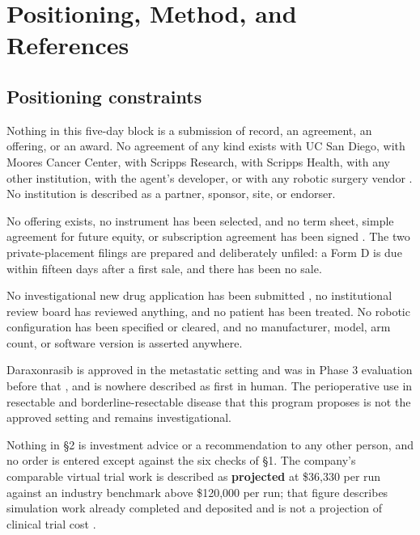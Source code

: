 \section{Positioning, Method, and References}

\subsection{Positioning constraints}

Nothing in this five-day block is a submission of record, an agreement, an
offering, or an award. No agreement of any kind exists with UC San Diego, with
Moores Cancer Center, with Scripps Research, with Scripps Health, with any other
institution, with the agent's developer, or with any robotic surgery vendor
\cite{ucsdmoores2026,scrippsdtc2026,revmedexternal2026}. No institution is
described as a partner, sponsor, site, or endorser.

No offering exists, no instrument has been selected, and no term sheet, simple
agreement for future equity, or subscription agreement has been signed
\cite{secformd2026}. The two private-placement filings are prepared and
deliberately unfiled: a Form D is due within fifteen days after a first sale, and
there has been no sale.

No investigational new drug application has been submitted \cite{ecfr2026part312},
no institutional review board has reviewed anything, and no patient has been
treated. No robotic configuration has been specified or cleared, and no
manufacturer, model, arm count, or software version is asserted anywhere.

Daraxonrasib is approved in the metastatic setting and was in Phase 3 evaluation
before that \cite{fdarasonque2026,rasolute302}, and is nowhere described as first
in human. The perioperative use in resectable and borderline-resectable disease
that this program proposes is not the approved setting and remains
investigational.

Nothing in \S2 is investment advice or a recommendation to any other person, and
no order is entered except against the six checks of \S1. The company's
comparable virtual trial work is described as \textbf{projected} at \$36,330 per
run against an industry benchmark above \$120,000 per run; that figure describes
simulation work already completed and deposited and is not a projection of
clinical trial cost \cite{capitalplan2026}.

